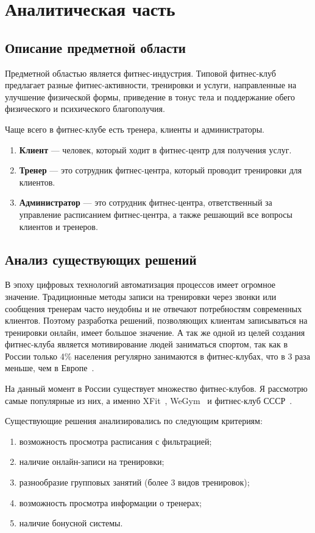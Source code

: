 \chapter{Аналитическая часть}

\section{Описание предметной области}\label{sec:предмет}

Предметной областью является фитнес-индустрия. Типовой фитнес-клуб предлагает разные фитнес-активности, тренировки и услуги, направленные на улучшение физической формы, приведение в тонус тела и поддержание обего физического и психического благополучия.

Чаще всего в фитнес-клубе есть тренера, клиенты и администраторы.
\begin{enumerate}[label=\arabic*)]
	\item \textbf{Клиент} --- человек, который ходит в фитнес-центр для получения услуг.
	\item \textbf{Тренер} --- это сотрудник фитнес-центра, который проводит тренировки для клиентов.
	\item \textbf{Администратор} --- это сотрудник фитнес-центра, ответственный за управление расписанием фитнес-центра, а также решающий все вопросы клиентов и тренеров.
\end{enumerate}

\section{Анализ существующих решений}

В эпоху цифровых технологий автоматизация процессов имеет огромное значение. Традиционные методы записи на тренировки через звонки или сообщения тренерам часто неудобны и не отвечают потребностям современных клиентов. Поэтому разработка решений, позволяющих клиентам записываться на тренировки онлайн, имеет большое значение.
А так же одной из целей создания фитнес-клуба является мотивирование людей заниматься спортом, так как в России только 4\% населения регулярно занимаются в фитнес-клубах, что в 3 раза меньше, чем в Европе~\cite{stat1}.

На данный момент в России существует множество фитнес-клубов. Я рассмотрю самые популярные из них, а именно XFit~\cite{xfit}, WeGym~\cite{wegym} и фитнес-клуб СССР~\cite{sssr}.

Существующие решения анализировались по следующим критериям:
\begin{enumerate}[label=\arabic*)]
	\item возможность просмотра расписания с фильтрацией;
	\item наличие онлайн-записи на тренировки;
	\item разнообразие групповых занятий (более 3 видов тренировок);
	\item возможность просмотра информации о тренерах;
	\item наличие бонусной системы.
\end{enumerate}

